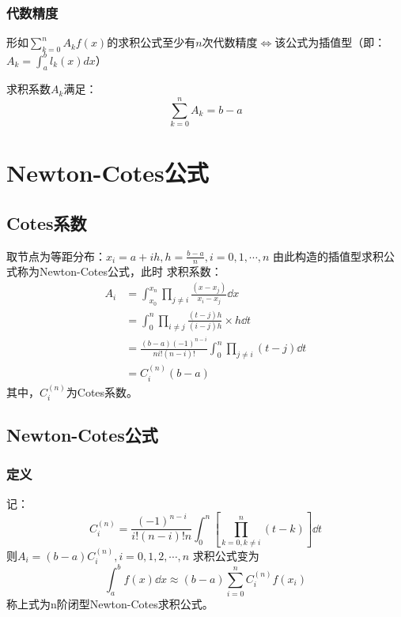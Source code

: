 \subsubsection{代数精度}
\begin{theorem}
    形如$\sum_{k=0}^{n}A_kf(x)$的求积公式至少有$n$次代数精度$\Leftrightarrow $该公式为插值型（即：$A_k = \int_{a}^{b}l_k(x)dx$）
    \begin{corollary}
        求积系数$A_k$满足：
        \begin{equation*}
            \sum_{k=0}^{n}A_k = b-a
        \end{equation*}
    \end{corollary}
\end{theorem}

\section{Newton-Cotes公式}

\subsection{Cotes系数}
取节点为等距分布：$x_i=a+ih, h=\frac{b-a}{n}, i=0,1,\cdots,n$
由此构造的插值型求积公式称为Newton-Cotes公式，此时
求积系数：
\begin{align*}%
    A_i &= \int_{x_0}^{x_n}\prod_{j\neq i}\frac{(x-x_j)}{x_i-x_j}\dd{x} \\
    &=\int_{0}^{n}\prod_{i\neq j}\frac{(t-j)h}{(i-j)h}\times h\dd{t} \\
    &= \frac{(b-a)(-1)^{n-i}}{ni!(n-i)!}\int_{0}^{n}\prod_{j\neq i}(t-j)\dd{t}\\
    &= C_i^{(n)}(b-a)
\end{align*}
其中，$C_i^{(n)}$为Cotes系数。

\subsection{Newton-Cotes公式}

\subsubsection{定义}

\begin{definition}
    记：
    \begin{equation*}
        C_i^{(n)} = \frac{(-1)^{n-i}}{i!(n-i)!n}\int_{0}^{n}[\prod_{k=0, k\neq i}^{n}(t-k)]\dd{t}
    \end{equation*}
    则$A_i = (b-a)C_i^{(n)},i=0,1,2,\cdots,n$
    求积公式变为
    \begin{equation*}
        \int_{a}^{b}f(x)\dd{x} \approx (b-a)\sum_{i=0}^{n}C_i^{(n)}f(x_i)
    \end{equation*}
    称上式为n阶闭型Newton-Cotes求积公式。
\end{definition}

